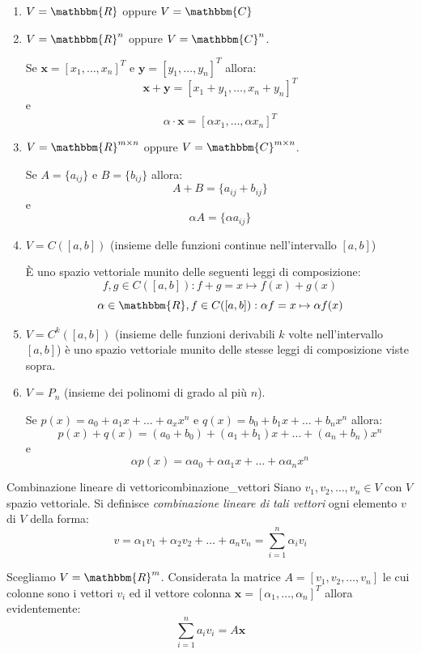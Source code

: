 \documentclass[12pt]{report}
\newcounter{definition}
\newcommand{\nmu}{}
\begin{document}
\begin{enumerate}
	\item $V = \mathbbm{R}$ oppure $V = \mathbbm{C}$
	\item $V = \mathbbm{R}^n$ oppure $V = \mathbbm{C}^n$.

	Se $\mathbf{x} = [x_1, \dots, x_n]^T$ e $\mathbf{y} = [y_1, \dots, y_n]^T$ allora:
	\[
	\mathbf{x + y} = [x_1 + y_1, \dots, x_n + y_n]^T
	\]
	e
	\[
	\alpha \cdot \mathbf{x} = [\alpha x_1, \dots, \alpha x_n]^T
	\]
	\item $V = \mathbbm{R}^{m\times n}$ oppure $V = \mathbbm{C}^{m\times n}$.

	Se $A = \{a_{ij}\}$ e $B = \{b_{ij}\}$ allora:
	\[
	A+B = \{a_{ij} + b_{ij}\}
	\]
	e
	\[
	\alpha A = \{\alpha a_{ij}\}
	\]
	\item $V = C([a, b])$ (insieme delle funzioni continue nell'intervallo $[a, b]$)

	È uno spazio vettoriale munito delle seguenti leggi di composizione:
	\[
	f, g \in C([a, b]): f+g = x \mapsto f(x) + g(x)
	\]
	\[
	\alpha \in \mathbbm{R}, f \in C([a, b]): \alpha f = x \mapsto \alpha f(x)
	\]
	\item $V = C^k([a,b])$ (insieme delle funzioni derivabili $k$ volte nell'intervallo $[a, b]$) è uno spazio vettoriale munito delle stesse leggi di composizione viste sopra.
	\item $V = P_n$ (insieme dei polinomi di grado al più $n$).

	Se $p(x) = a_0 + a_1x + \dots + a_x x^n$ e $q(x) = b_0 + b_1x + \dots + b_n x^n$ allora:
	\[
	p(x) + q(x) = (a_0 + b_0) + (a_1 + b_1)x + \dots + (a_n + b_n)x^n
	\]
	e
	\[
	\alpha p(x) = \alpha a_0 + \alpha a_1x + \dots + \alpha a_nx^n
	\]
\end{enumerate}
\begin{definition}{\nmu Combinazione lineare di vettori}{combinazione_vettori}
	Siano $v_1, v_2, \dots, v_n \in V$ con $V$ spazio vettoriale. Si definisce \textit{combinazione lineare di tali vettori} ogni elemento $v$ di $V$ della forma:
	\[
	v = \alpha_1v_1 + \alpha_2v_2 + \dots + a_nv_n = \displaystyle\sum_{i=1}^{n}\alpha_iv_i
	\]
\end{definition}
\begin{note}{}{}
Scegliamo $V = \mathbbm{R}^m$. Considerata la matrice $A = [v_1, v_2, \dots, v_n]$ le cui colonne sono i vettori $v_i$ ed il vettore colonna $\mathbf{x} = [\alpha_1, \dots, \alpha_n]^T$ allora evidentemente:
\[
\displaystyle\sum_{i=1}^{n}a_iv_i = A\mathbf{x}
\]
\end{note}
\end{document}
